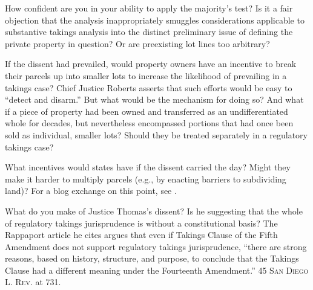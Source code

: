 
\item How confident are you in your ability to apply the majority's test? Is it
a fair objection that the analysis inappropriately smuggles considerations
applicable to substantive takings analysis into the distinct preliminary issue
of defining the private property in question? Or are preexisting lot lines too
arbitrary? 

\item If the dissent had prevailed, would property owners have an incentive to
break their parcels up into smaller lots to increase the likelihood of
prevailing in a takings case? Chief Justice Roberts asserts that such efforts
would be easy to ``detect and disarm.'' But what would be the mechanism for
doing so? And what if a piece of property had been owned and transferred as an
undifferentiated whole for decades, but nevertheless encompassed portions that
had once been sold as individual, smaller lots? Should they be treated
separately in a regulatory takings case?




\item What incentives would states have if the dissent carried the day? Might
they make it harder to multiply parcels (e.g., by enacting barriers to
subdividing land)? For a blog exchange on this point, see
.

\item What do you make of Justice Thomas's dissent? Is he suggesting that the
whole of regulatory takings jurisprudence is without a constitutional basis? The
Rappaport article he cites argues that even if Takings Clause of the Fifth
Amendment does not support regulatory takings jurisprudence, ``there are strong
reasons, based on history, structure, and purpose, to conclude that the Takings
Clause had a different meaning under the Fourteenth Amendment.'' 45 \textsc{San
Diego L. Rev.} at 731.

